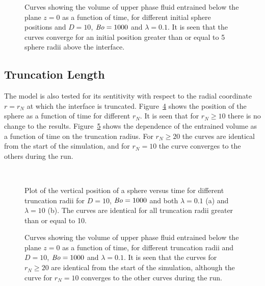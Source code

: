 \documentclass[12pt]{article}
\newcommand\Bo{\mbox{\textit{Bo}}}  %
\begin{document}
  \begin{figure}
        
    \caption{Curves showing the volume of upper phase fluid entrained below the plane $z = 0$ as a function of time, for different initial sphere positions and $D = 10$, $\Bo = 1000$ and $\lambda = 0.1$. It is seen that the curves converge for an initial position greater than or equal to 5 sphere radii above the interface. \label{fig:height_vol_test}}
  \end{figure}

\subsection{Truncation Length}
\label{subsec:trunc_length}

The model is also tested for its sentitivity with respect to the radial coordinate $r = r_{N}$ at which the interface is truncated. Figure~\ref{fig:trunc_test_pos} shows the position of the sphere as a function of time for different $r_{N}$. It is seen that for $r_{N} \geq 10$ there is no change to the results. Figure~\ref{fig:trunc_vol_test} shows the dependence of the entrained volume as a function of time on the truncation radius. For $r_{N} \geq 20$ the curves are identical from the start of the simulation, and for $r_{N} = 10$ the curve converges to the others during the run.


    \begin{figure}
      \centering
      \begin{subfigure}[b]{0.5\textwidth}
        \resizebox{\textwidth}{!}{\Large }
        \caption{}
        \label{fig:trunc_test_pos_tail}
      \end{subfigure}%
      ~
      \begin{subfigure}[b]{0.5\textwidth}
        \resizebox{\textwidth}{!}{\Large }
        \caption{}
        \label{fig:trunc_test_pos_film}
      \end{subfigure}
      \caption{Plot of the vertical position of a sphere versus time for different truncation radii for $D = 10$, $\Bo = 1000$ and both $\lambda = 0.1$ (a) and $\lambda = 10$ (b). The curves are identical for all truncation radii greater than or equal to 10.}\label{fig:trunc_test_pos}
    \end{figure}

  \begin{figure}
    \resizebox{\textwidth}{!}{\Large }
    \caption{Curves showing the volume of upper phase fluid entrained below the plane $z = 0$ as a function of time, for different truncation radii and $D = 10$, $\Bo = 1000$ and $\lambda = 0.1$. It is seen that the curves for $r_{N} \geq 20$ are identical from the start of the simulation, although the curve for $r_{N} = 10$ converges to the other curves during the run. \label{fig:trunc_vol_test}}
  \end{figure}
\end{document}
